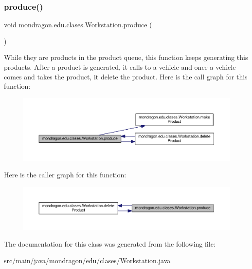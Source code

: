 \subsubsection{\texorpdfstring{produce()}{produce()}}
{\footnotesize\ttfamily void mondragon.\+edu.\+clases.\+Workstation.\+produce (\begin{DoxyParamCaption}{ }\end{DoxyParamCaption})\hspace{0.3cm}{\ttfamily [inline]}}

While they are products in the product queue, this function keeps generating this products. After a product is generated, it calls to a vehicle and once a vehicle comes and takes the product, it delete the product. Here is the call graph for this function\+:\nopagebreak
\begin{figure}[H]
\begin{center}
\leavevmode
\includegraphics[width=350pt]{classmondragon_1_1edu_1_1clases_1_1_workstation_a574730f7c7ff1e429e7d25104eefac42_cgraph}
\end{center}
\end{figure}
Here is the caller graph for this function\+:\nopagebreak
\begin{figure}[H]
\begin{center}
\leavevmode
\includegraphics[width=350pt]{classmondragon_1_1edu_1_1clases_1_1_workstation_a574730f7c7ff1e429e7d25104eefac42_icgraph}
\end{center}
\end{figure}


The documentation for this class was generated from the following file\+:\begin{DoxyCompactItemize}
\item 
src/main/java/mondragon/edu/clases/Workstation.\+java\end{DoxyCompactItemize}
